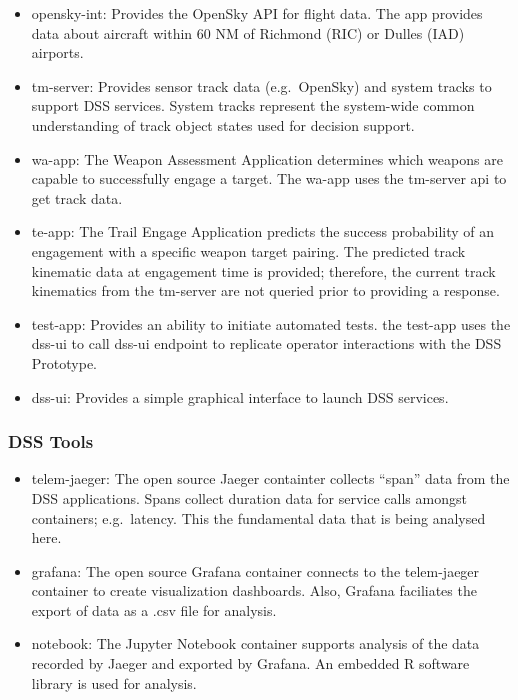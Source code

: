 \documentclass[
  letterpaper,
  DIV=11,
  numbers=noendperiod]{scrartcl}
\providecommand{\tightlist}{%
  \setlength{\itemsep}{0pt}\setlength{\parskip}{0pt}}\usepackage{longtable,booktabs,array}
\begin{document}
\begin{itemize}
\tightlist
\item
  opensky-int: Provides the OpenSky API for flight data. The app
  provides data about aircraft within 60 NM of Richmond (RIC) or Dulles
  (IAD) airports.
\item
  tm-server: Provides sensor track data (e.g.~OpenSky) and system tracks
  to support DSS services. System tracks represent the system-wide
  common understanding of track object states used for decision support.
\item
  wa-app: The Weapon Assessment Application determines which weapons are
  capable to successfully engage a target. The wa-app uses the tm-server
  api to get track data.
\item
  te-app: The Trail Engage Application predicts the success probability
  of an engagement with a specific weapon target pairing. The predicted
  track kinematic data at engagement time is provided; therefore, the
  current track kinematics from the tm-server are not queried prior to
  providing a response.
\item
  test-app: Provides an ability to initiate automated tests. the
  test-app uses the dss-ui to call dss-ui endpoint to replicate operator
  interactions with the DSS Prototype.
\item
  dss-ui: Provides a simple graphical interface to launch DSS services.
\end{itemize}

\hypertarget{dss-tools}{%
\subsubsection{DSS Tools}\label{dss-tools}}

\begin{itemize}
\tightlist
\item
  telem-jaeger: The open source Jaeger containter collects ``span'' data
  from the DSS applications. Spans collect duration data for service
  calls amongst containers; e.g.~latency. This the fundamental data that
  is being analysed here.
\item
  grafana: The open source Grafana container connects to the
  telem-jaeger container to create visualization dashboards. Also,
  Grafana faciliates the export of data as a .csv file for analysis.
\item
  notebook: The Jupyter Notebook container supports analysis of the data
  recorded by Jaeger and exported by Grafana. An embedded R software
  library is used for analysis.
\end{itemize}
\end{document}

